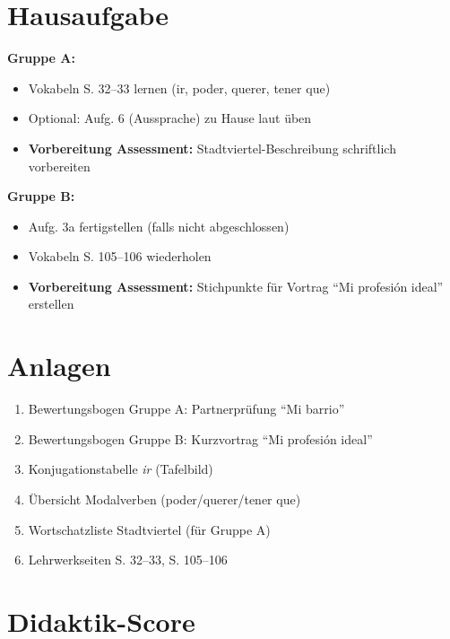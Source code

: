 \documentclass[11pt,a4paper]{article}
\begin{document}
\section{Hausaufgabe}

\textbf{Gruppe A:}
\begin{itemize}
    \item Vokabeln S. 32--33 lernen (ir, poder, querer, tener que)
    \item Optional: Aufg. 6 (Aussprache) zu Hause laut üben
    \item \textbf{Vorbereitung Assessment:} Stadtviertel-Beschreibung schriftlich vorbereiten
\end{itemize}

\textbf{Gruppe B:}
\begin{itemize}
    \item Aufg. 3a fertigstellen (falls nicht abgeschlossen)
    \item Vokabeln S. 105--106 wiederholen
    \item \textbf{Vorbereitung Assessment:} Stichpunkte für Vortrag ``Mi profesión ideal'' erstellen
\end{itemize}

\section{Anlagen}

\begin{enumerate}
    \item Bewertungsbogen Gruppe A: Partnerprüfung ``Mi barrio''
    \item Bewertungsbogen Gruppe B: Kurzvortrag ``Mi profesión ideal''
    \item Konjugationstabelle \textit{ir} (Tafelbild)
    \item Übersicht Modalverben (poder/querer/tener que)
    \item Wortschatzliste Stadtviertel (für Gruppe A)
    \item Lehrwerkseiten S. 32--33, S. 105--106
\end{enumerate}

\newpage
\section{Didaktik-Score}
\end{document}
